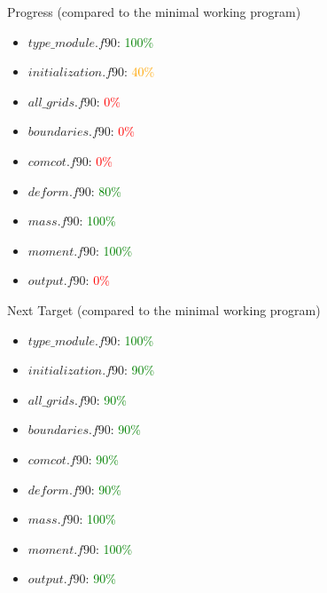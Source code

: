 \documentclass{beamer}
\begin{document}
\begin{frame}{Progress (compared to the minimal working program)}
    \begin{itemize}
        \item $type\_module.f90$: \textcolor{green}{100\%}
        \item $initialization.f90$: \textcolor{orange}{40\%}
        \item $all\_grids.f90$: \textcolor{red}{0\%}
        \item $boundaries.f90$: \textcolor{red}{0\%}
        \item $comcot.f90$: \textcolor{red}{0\%}
        \item $deform.f90$: \textcolor{green}{80\%}
        \item $mass.f90$: \textcolor{green}{100\%}
        \item $moment.f90$: \textcolor{green}{100\%}
        \item $output.f90$: \textcolor{red}{0\%}
    \end{itemize}
\end{frame}

\begin{frame}{Next Target (compared to the minimal working program)}
    \begin{itemize}
        \item $type\_module.f90$: \textcolor{green}{100\%}
        \item $initialization.f90$: \textcolor{green}{90\%}
        \item $all\_grids.f90$: \textcolor{green}{90\%}
        \item $boundaries.f90$: \textcolor{green}{90\%}
        \item $comcot.f90$: \textcolor{green}{90\%}
        \item $deform.f90$: \textcolor{green}{90\%}
        \item $mass.f90$: \textcolor{green}{100\%}
        \item $moment.f90$: \textcolor{green}{100\%}
        \item $output.f90$: \textcolor{green}{90\%}
    \end{itemize}
\end{frame}
\end{document}
